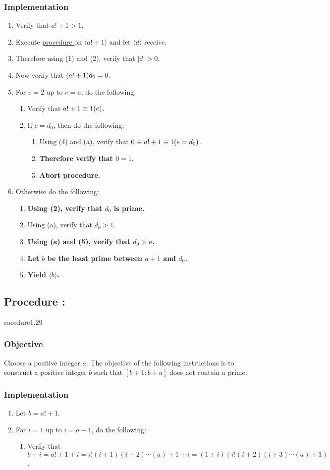 \documentclass{article}
\let\mod\relax\DeclareMathOperator{\mod}{mod}
\newcounter{procedure}[part]
\newcommand{\procedure}[1]{\subsection*{Procedure \thepart:\theprocedure}\label{sec:procedure #1}\global\expandafter\edef\csname procedure#1\endcsname{\thepart:\theprocedure}\addtocounter{procedure}{1}}
\newcommand{\objective}{\subsubsection*{Objective}}
\newcommand{\implementation}{\subsubsection*{Implementation}}
\newcommand{\procedurehr}[1]{\hyperref[sec:procedure #1]{procedure \expandafter\csname procedure#1\endcsname}}
\begin{document}
\begin{multicols}{2}
			\implementation
				\begin{enumerate}
					\item Verify that $a!+1>1$.
					\item Execute \procedurehr{1.24} on $\langle a!+1\rangle$ and let $\langle d\rangle$ receive.
					\item Therefore using (1) and (2), verify that $\lvert d\rvert>0$.
					\item Now verify that $(a!+1)\mod d_0=0$.
					\item For $e=2$ up to $e=a$, do the following:
					\begin{enumerate}
						\item Verify that $a!+1\equiv 1 (\mod e)$.
						\item If $e=d_0$, then do the following:
						\begin{enumerate}
							\item Using (4) and (a), verify that $0\equiv a!+1\equiv 1(\mod e=d_0)$.
							\item \textbf{Therefore verify that $0=1$.}
							\item \textbf{Abort procedure.}
						\end{enumerate}
					\end{enumerate}
					\item Otherwise do the following:
					\begin{enumerate}
						\item \textbf{Using (2), verify that $d_0$ is prime.}
						\item Using (a), verify that $d_0>1$.
						\item \textbf{Using (a) and (5), verify that $d_0>a$.}
						\item \textbf{Let $b$ be the least prime between $a+1$ and $d_0$.}
						\item \textbf{Yield $\langle b\rangle$.}
					\end{enumerate}
				\end{enumerate}
		\procedure{1.29}
			\objective
				Choose a positive integer $a$. The objective of the following instructions is to construct a positive integer $b$ such that $[b+1:b+a]$ does not contain a prime.
			\implementation
				\begin{enumerate}
					\item Let $b=a!+1$.
					\item For $i=1$ up to $i=a-1$, do the following:
					\begin{enumerate}
						\item Verify that $b+i=a!+1+i=i!(i+1)(i+2)\cdots(a)+1+i=(1+i)(i!(i+2)(i+3)\cdots(a) +1)$.

\end{enumerate}
\end{enumerate}
\end{multicols}
\end{document}
